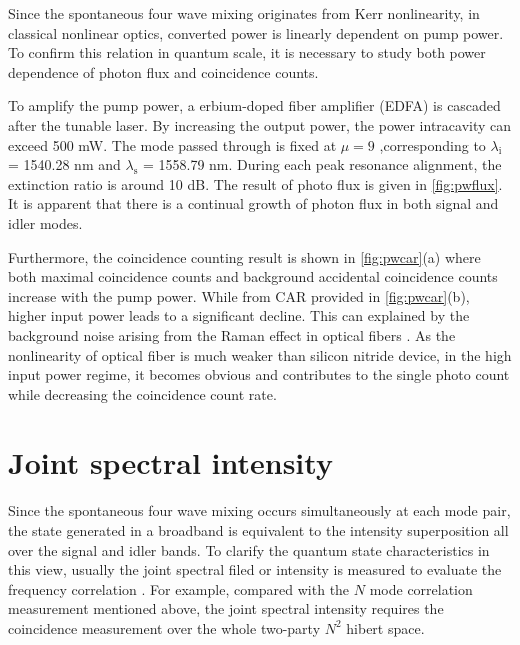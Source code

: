 Since the spontaneous four wave mixing originates from Kerr nonlinearity, in classical nonlinear optics, converted power is linearly dependent on pump power. To confirm this relation in quantum scale, it is necessary to study both power dependence of photon flux and coincidence counts.

To amplify the pump power, a erbium-doped fiber amplifier (EDFA) is cascaded after the tunable laser. By increasing the output power, the power intracavity can exceed 500 mW. 
The mode passed through is fixed at $ \mu=9 $ ,corresponding to $\lambda_\mathrm{i}$ = 1540.28 nm and $\lambda_\mathrm{s}$ = 1558.79 nm. During each peak resonance alignment, the extinction ratio is around 10 dB. 
The result of photo flux is given in \autoref{fig:pwflux}. It is apparent that there is a continual growth of photon flux in both signal and idler modes. 

\begin{figure}
	\centering
	
	\mycaption{}{}
	\label{fig:pwflux}
\end{figure}

\begin{figure}
	\centering
	
	\mycaption{}{}
	\label{fig:pwcar}
\end{figure}

Furthermore, the coincidence counting result is shown in \autoref{fig:pwcar}(a) where both maximal coincidence counts and background accidental coincidence counts increase with the pump power. While from CAR provided in \autoref{fig:pwcar}(b), higher input power leads to a significant decline. This can explained by the background noise arising from the Raman effect in optical fibers \cite{Engin2012, Sugiura2019}
. As the nonlinearity of optical fiber is much weaker than silicon nitride device, in the high input power regime, it becomes obvious and contributes to the single photo count while decreasing the coincidence count rate.

\section{Joint spectral intensity}

Since the spontaneous four wave mixing occurs simultaneously at each mode pair, the state generated in a broadband is equivalent to the intensity superposition all over the signal and idler bands. To clarify the quantum state characteristics in this view, usually the joint spectral filed or intensity is measured to evaluate the frequency correlation \cites{Helt2010,Vernon2015b}. For example, compared with the $ N $ mode correlation measurement mentioned above, the joint spectral intensity requires the coincidence measurement over the whole two-party $ N^2 $ hibert space.

